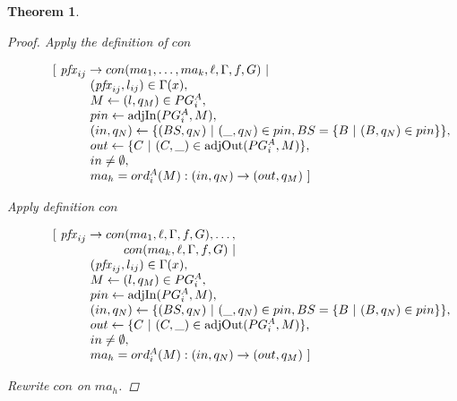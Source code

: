 \documentclass[twocolumn, openany]{sig-alternate-10pt}
\newtheorem{thm}{Theorem}
\begin{document}
\begin{thm}
\begin{proof}
  Apply the definition of $con$

  \[ \begin{array}{l}
     ~~~~~~~~~ [~ \mathit{pfx}_{ij} \rightarrow con(ma_1, \dots, ma_k,\ell,\Gamma,f,G) ~\vert~ \\
     ~~~~~~~~~~~~~~~~~~ (\mathit{pfx}_{ij},l_{ij}) \in \Gamma(x), \\
     ~~~~~~~~~~~~~~~~~~ M \leftarrow (l,q_M) \in PG^A_i, \\
     ~~~~~~~~~~~~~~~~~~ pin \leftarrow \text{adjIn}(PG^A_i,M), \\
     ~~~~~~~~~~~~~~~~~~ (in,q_N) \leftarrow \{ (BS,q_N) ~\vert~ (\_,q_N) \in pin, BS=\{B ~\vert~ (B,q_N) \in pin \} \}, \\
     ~~~~~~~~~~~~~~~~~~ out \leftarrow \{ C ~\vert~ (C,\_) \in \text{adjOut}(PG^A_i,M) \}, \\
     ~~~~~~~~~~~~~~~~~~ in \neq \emptyset, \\
     ~~~~~~~~~~~~~~~~~~ ma_h = ord^A_i(M) : (in,q_N) \rightarrow (out,q_M) ~] \\
  \end{array} \]%

  Apply definition $con$

  \[ \begin{array}{l}
     ~~~~~~~~~ [~ \mathit{pfx}_{ij} \rightarrow con(ma_1,\ell,\Gamma,f,G), \dots, \\ 
     ~~~~~~~~~~~~~~~~~~~~~~~~~~ con(ma_k,\ell,\Gamma,f,G) ~\vert~ \\
     ~~~~~~~~~~~~~~~~~~ (\mathit{pfx}_{ij},l_{ij}) \in \Gamma(x), \\
     ~~~~~~~~~~~~~~~~~~ M \leftarrow (l,q_M) \in PG^A_i, \\
     ~~~~~~~~~~~~~~~~~~ pin \leftarrow \text{adjIn}(PG^A_i,M), \\
     ~~~~~~~~~~~~~~~~~~ (in,q_N) \leftarrow \{ (BS,q_N) ~\vert~ (\_,q_N) \in pin, BS=\{B ~\vert~ (B,q_N) \in pin \} \}, \\
     ~~~~~~~~~~~~~~~~~~ out \leftarrow \{ C ~\vert~ (C,\_) \in \text{adjOut}(PG^A_i,M) \}, \\
     ~~~~~~~~~~~~~~~~~~ in \neq \emptyset, \\
     ~~~~~~~~~~~~~~~~~~ ma_h = ord^A_i(M) : (in,q_N) \rightarrow (out,q_M) ~] \\
  \end{array} \]%

  Rewrite $con$ on $ma_h$.


\end{proof}
\end{thm}
\end{document}
